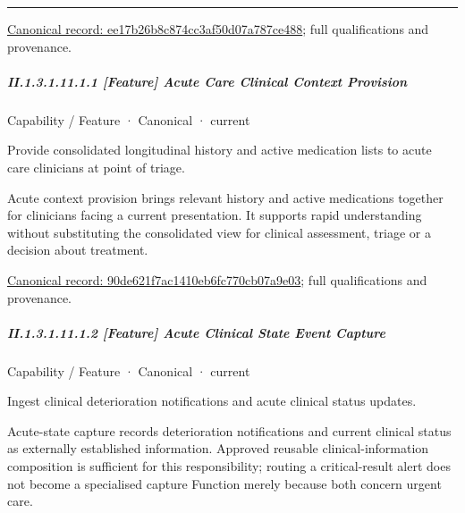 \medskip\hrule\medskip

{\footnotesize \href{../../../../../../../continuum/strategy/capability/ee17b26b8c874cc3af50d07a787ce488.md}{Canonical record: ee17b26b8c874cc3af50d07a787ce488}; full qualifications and provenance.}\par
\subparagraph*{II.1.3.1.11.1.1 [Feature] Acute Care Clinical Context Provision}
\label{navigation:II.1.3.1.11.1.1}

\label{element:90de621f7ac1410eb6fc770cb07a9e03}
{\small Capability / Feature · Canonical · current}\par

Provide consolidated longitudinal history and active medication lists to acute care clinicians at point of triage.



Acute context provision brings relevant history and active medications together for clinicians facing a current presentation. It supports rapid understanding without substituting the consolidated view for clinical assessment, triage or a decision about treatment.


{\footnotesize \href{../../../../../../../continuum/strategy/capability/feature/90de621f7ac1410eb6fc770cb07a9e03.md}{Canonical record: 90de621f7ac1410eb6fc770cb07a9e03}; full qualifications and provenance.}\par
\subparagraph*{II.1.3.1.11.1.2 [Feature] Acute Clinical State Event Capture}
\label{navigation:II.1.3.1.11.1.2}

\label{element:566f6934c9b04627b0876f91bedd8f30}
{\small Capability / Feature · Canonical · current}\par

Ingest clinical deterioration notifications and acute clinical status updates.



Acute-state capture records deterioration notifications and current clinical status as externally established information. Approved reusable clinical-information composition is sufficient for this responsibility; routing a critical-result alert does not become a specialised capture Function merely because both concern urgent care.


